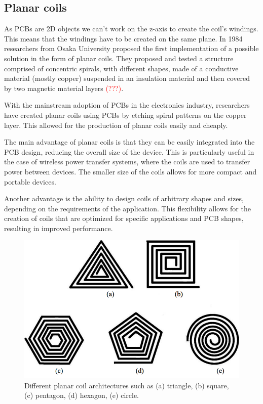 \subsection{Planar coils}
As PCBs are 2D objects we can't work on the z-axis to create the coil's windings. This means that the windings have to be created on the same plane. 
In 1984 researchers from Osaka University proposed the first implementation of a possible solution in the form of planar coils.
They proposed and tested a structure comprised of concentric spirals, with different shapes, made of a conductive material (mostly copper) suspended in an insulation material and then covered by two magnetic material layers \textcolor{red}{(???)}\cite{OG_plan_coils}.



With the mainstream adoption of PCBs in the electronics industry, researchers have created planar coils using PCBs by etching spiral patterns on the copper layer. This allowed for the production of planar coils easily and cheaply.

The main advantage of planar coils is that they can be easily integrated into the PCB design, reducing the overall size of the device. This is particularly useful in the case of wireless power transfer systems, where the coils are used to transfer power between devices. The smaller size of the coils allows for more compact and portable devices.

Another advantage is the ability to design coils of arbitrary shapes and sizes, depending on the requirements of the application. This flexibility allows for the creation of coils that are optimized for specific applications and PCB shapes, resulting in improved performance.

\begin{figure}[th]
    \centering
    \includegraphics[scale=0.4]{Chapters/Chapter2/PCB_coils/Figures/coils_shapes.png}
    \caption[Coils Shapes]{Different planar coil architectures such as (a) triangle, (b) square, (c)
    pentagon, (d) hexagon, (e) circle.}
    \label{fig: Coils Shapes}
\end{figure}